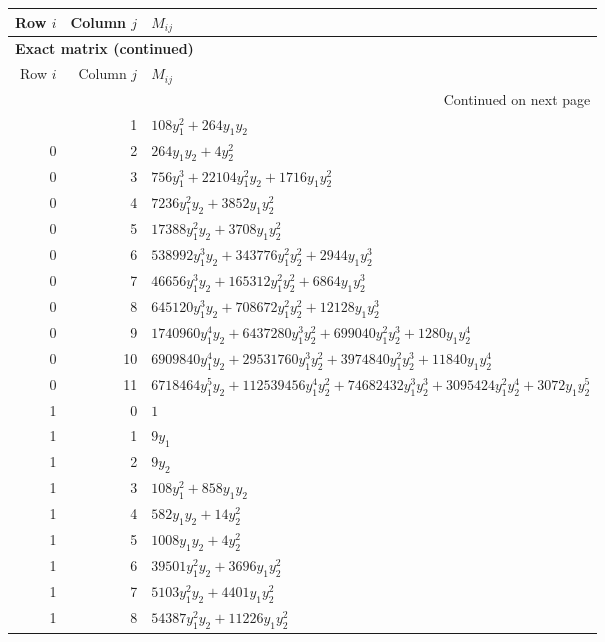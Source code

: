 \documentclass[10pt,a4paper]{article}
\begin{document}
{\small\setlength{\tabcolsep}{7pt}\begin{longtable}{rrp{125mm}}
\toprule Row $i$ & Column $j$ & $M_{ij}$\\\midrule\endfirsthead
\multicolumn{3}{l}{\textbf{Exact matrix (continued)}}\\
\toprule Row $i$ & Column $j$ & $M_{ij}$\\\midrule\endhead
\midrule\multicolumn{3}{r}{Continued on next page}\\\endfoot\bottomrule\endlastfoot
0 & 1 & $108 y_{1}^{2} + 264 y_{1} y_{2}$\\
0 & 2 & $264 y_{1} y_{2} + 4 y_{2}^{2}$\\
0 & 3 & $756 y_{1}^{3} + 22104 y_{1}^{2} y_{2} + 1716 y_{1} y_{2}^{2}$\\
0 & 4 & $7236 y_{1}^{2} y_{2} + 3852 y_{1} y_{2}^{2}$\\
0 & 5 & $17388 y_{1}^{2} y_{2} + 3708 y_{1} y_{2}^{2}$\\
0 & 6 & $538992 y_{1}^{3} y_{2} + 343776 y_{1}^{2} y_{2}^{2} + 2944 y_{1} y_{2}^{3}$\\
0 & 7 & $46656 y_{1}^{3} y_{2} + 165312 y_{1}^{2} y_{2}^{2} + 6864 y_{1} y_{2}^{3}$\\
0 & 8 & $645120 y_{1}^{3} y_{2} + 708672 y_{1}^{2} y_{2}^{2} + 12128 y_{1} y_{2}^{3}$\\
0 & 9 & $1740960 y_{1}^{4} y_{2} + 6437280 y_{1}^{3} y_{2}^{2} + 699040 y_{1}^{2} y_{2}^{3} + 1280 y_{1} y_{2}^{4}$\\
0 & 10 & $6909840 y_{1}^{4} y_{2} + 29531760 y_{1}^{3} y_{2}^{2} + 3974840 y_{1}^{2} y_{2}^{3} + 11840 y_{1} y_{2}^{4}$\\
0 & 11 & $6718464 y_{1}^{5} y_{2} + 112539456 y_{1}^{4} y_{2}^{2} + 74682432 y_{1}^{3} y_{2}^{3} + 3095424 y_{1}^{2} y_{2}^{4} + 3072 y_{1} y_{2}^{5}$\\
1 & 0 & $1$\\
1 & 1 & $9 y_{1}$\\
1 & 2 & $9 y_{2}$\\
1 & 3 & $108 y_{1}^{2} + 858 y_{1} y_{2}$\\
1 & 4 & $582 y_{1} y_{2} + 14 y_{2}^{2}$\\
1 & 5 & $1008 y_{1} y_{2} + 4 y_{2}^{2}$\\
1 & 6 & $39501 y_{1}^{2} y_{2} + 3696 y_{1} y_{2}^{2}$\\
1 & 7 & $5103 y_{1}^{2} y_{2} + 4401 y_{1} y_{2}^{2}$\\
1 & 8 & $54387 y_{1}^{2} y_{2} + 11226 y_{1} y_{2}^{2}$\\

\end{longtable}}
\end{document}
